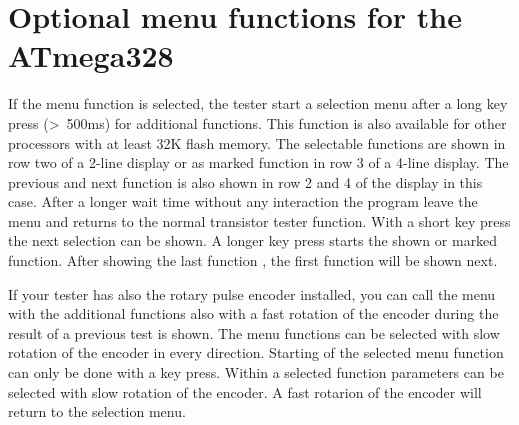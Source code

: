 \section{Optional menu functions for the ATmega328}
If the menu function is selected, the tester start a selection menu after a long key press (\textgreater~500ms)
for additional functions.
This function is also available for other processors with at least 32K flash memory.
The selectable functions are shown in row two of a 2-line display or as marked function in row 3 of a 4-line display.
The previous and next function is also shown in row 2 and 4 of the display in this case.
After a longer wait time without any interaction the program leave the menu and returns to the normal transistor tester function.
With a short key press the next selection can be shown.
A longer key press starts the shown or marked function.
After showing the last function , the first function will be shown next.

If your tester has also the rotary pulse encoder installed, you can call the menu with the additional functions
also with a fast rotation of the encoder during the result of a previous test is shown.
The menu functions can be selected with slow rotation of the encoder in every direction.
Starting of the selected menu function can only be done with a key press.
Within a selected function parameters can be selected with slow rotation of the encoder.
A fast rotarion of the encoder will return to the selection menu.

